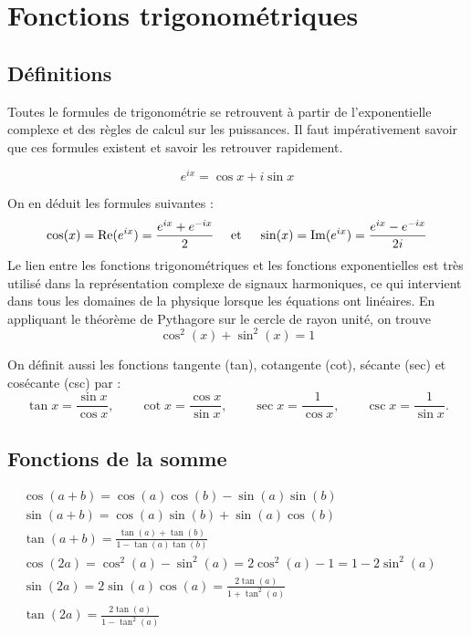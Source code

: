 

\Entete[formu][D]{}

\section{Fonctions trigonométriques}

\subsection{Définitions}

Toutes le formules de trigonométrie se retrouvent à partir de l'exponentielle complexe et des règles de calcul sur les puissances. Il faut impérativement savoir que ces formules existent et savoir les retrouver rapidement.

\begin{theorem}\label{form:}
        $$
        e^{i x}=\cos x+i \sin x 
        $$
\end{theorem}
On en déduit les formules suivantes :
$$
\cos (x)={\rm Re}(e^{ix}) = \frac{e^{i x}+e^{-i x}}{2} \quad \text { et } \quad \sin (x)={\rm Im}(e^{ix}) = \frac{e^{i x}-e^{-i x}}{2 i}
$$
Le lien entre les fonctions trigonométriques et les fonctions exponentielles est très utilisé dans la représentation complexe de signaux harmoniques, ce qui intervient dans tous les domaines de la physique lorsque les équations ont linéaires.
En appliquant le théorème de Pythagore sur le cercle de rayon unité, on trouve
$$\cos ^{2}(x)+\sin ^{2}(x)=1$$

On définit aussi les fonctions tangente (tan), cotangente (cot), sécante (sec) et cosécante (csc) par : 
$$
\tan x = \frac{\sin x}{\cos x}, \qquad \cot x = \frac{\cos x}{\sin x}, \qquad \sec x = \frac{1}{\cos x}, \qquad \csc x = \frac{1}{\sin x}.
$$



\subsection{Fonctions de la somme}

$
\begin{aligned} 
   & \cos (a+b)  =\cos (a) \cos (b)-\sin (a) \sin (b)\\ 
   & \sin (a+b)  =\cos (a) \sin (b)+\sin (a) \cos (b) \\ 
   & \tan (a+b)  =\frac{\tan (a)+\tan (b)}{1-\tan (a) \tan (b)} \\
   & \cos (2 a)  =\cos ^{2}(a)-\sin ^{2}(a)=2 \cos ^{2}(a)-1=1-2 \sin ^{2}(a)\\
   & \sin (2 a)  =2 \sin (a) \cos (a) =\frac{2 \tan (a)}{1+\tan ^{2}(a)}\\
   & \tan (2 a)  = \frac{2 \tan (a)}{1-\tan ^{2}(a)}\\
\end{aligned}
$

